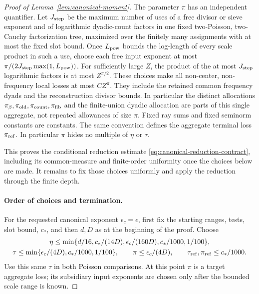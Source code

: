 \documentclass[12pt]{article}
\begin{document}
\begin{proof}[Proof of Lemma~\ref{lem:canonical-moment}]
The parameter \(\pi\) has an independent quantifier.  Let \(J_{\rm step}\)
be the maximum number of uses of a free divisor or sieve exponent and
of logarithmic dyadic-count factors in one fixed two-Poisson, two-Cauchy
factorization tree, maximized over the finitely many assignments with at
most the fixed slot bound.  Once \(L_{\rm pow}\) bounds the log-length of
every scale product in such a use, choose each free input exponent at most
\(\pi/(2J_{\rm step}\max(1,L_{\rm pow}))\).  For sufficiently large \(Z\),
the product of the at most \(J_{\rm step}\) logarithmic factors is at most
\(Z^{\pi/2}\).  These choices make all non-center, non-frequency local
losses at most \(CZ^\pi\).  They include the retained common frequency
dyads and the reconstruction divisor bounds.  In particular the distinct
allocations \(\pi_\beta,\pi_{\rm old},\pi_{\rm count},\pi_{\rm fib}\)
and the finite-union dyadic allocation are parts of this single
aggregate, not repeated allowances of size \(\pi\).  Fixed ray sums and fixed
seminorm constants are constants.  The same convention defines the
aggregate terminal loss \(\pi_{\rm ref}\).  In particular \(\pi\) hides
no multiple of \(\eta\) or \(\tau\).

This proves the conditional reduction estimate
\eqref{eq:canonical-reduction-contract}, including its common-measure and
finite-order uniformity once the choices below are made. It remains to fix
those choices uniformly and apply the reduction through the finite depth.

\paragraph{Order of choices and termination.}
For the requested canonical exponent \(\epsilon_c=\epsilon\), first fix
the starting ranges, tests, slot bound, \(c_*\), and then \(d,D\) as at
the beginning of the proof.  Choose
\begin{equation}\label{eq:inverse-parameter-order}
 \begin{gathered}
 \eta\le\min\{d/16,c_*/(14D),\epsilon_c/(160D),c_*/1000,1/100\},\\
 \tau\le\min\{\epsilon_c/(4D),c_*/1000,1/100\},\qquad
 \pi\le\epsilon_c/(4D),\qquad
 \tau_{\rm ref},\pi_{\rm ref}\le c_*/1000.
 \end{gathered}
\end{equation}
Use this same \(\tau\) in both Poisson comparisons.  At this point \(\pi\)
is a target aggregate loss; its subsidiary input exponents are chosen
only after the bounded scale range is known.


\end{proof}
\end{document}
